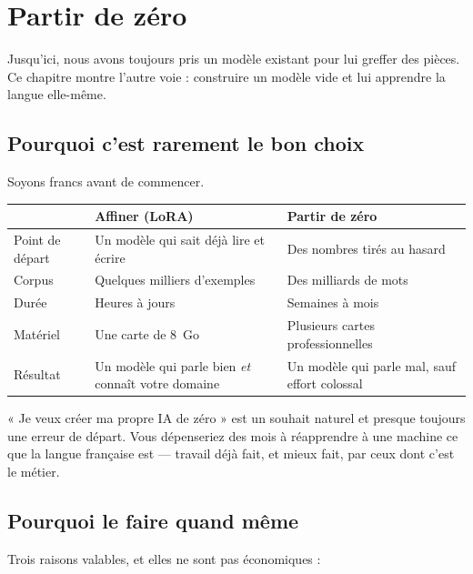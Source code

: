 \chapter{Partir de zéro}

Jusqu'ici, nous avons toujours pris un modèle existant pour lui greffer des
pièces. Ce chapitre montre l'autre voie : construire un modèle vide et lui
apprendre la langue elle-même.

\section{Pourquoi c'est rarement le bon choix}

Soyons francs avant de commencer.

\begin{center}
\begin{tabular}{p{3.6cm}p{4.8cm}p{5.2cm}}
\toprule
 & \textbf{Affiner (LoRA)} & \textbf{Partir de zéro} \\
\midrule
Point de départ & Un modèle qui sait déjà lire et écrire & Des nombres tirés au
                  hasard \\
Corpus & Quelques milliers d'exemples & Des milliards de mots \\
Durée & Heures à jours & Semaines à mois \\
Matériel & Une carte de 8~Go & Plusieurs cartes professionnelles \\
Résultat & Un modèle qui parle bien \emph{et} connaît votre domaine & Un modèle
           qui parle mal, sauf effort colossal \\
\bottomrule
\end{tabular}
\end{center}

\begin{nkpiege}
« Je veux créer ma propre IA de zéro » est un souhait naturel et presque
toujours une erreur de départ. Vous dépenseriez des mois à réapprendre à une
machine ce que la langue française est — travail déjà fait, et mieux fait, par
ceux dont c'est le métier.
\end{nkpiege}

\section{Pourquoi le faire quand même}

Trois raisons valables, et elles ne sont pas économiques :

